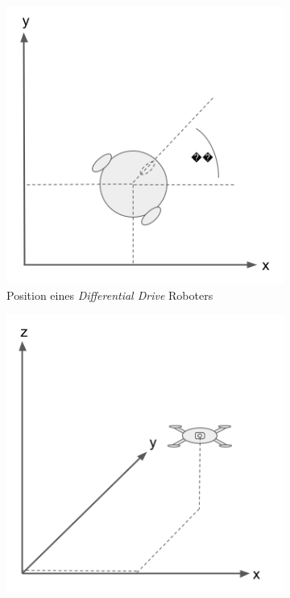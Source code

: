 \mbox{}
\begin{figure}
  \begin{subfigure}[t]{.3\textwidth}
    \centering
    \includegraphics[width=.9\linewidth]{pic/vorwissen/1a_diffdrive.png}
    \caption{Position eines \textit{Differential Drive} Roboters}
    \label{fig:1a_dd}
  \end{subfigure}\hfill
  \begin{subfigure}[t]{.3\textwidth}
    \centering
    \includegraphics[width=.9\linewidth]{pic/vorwissen/1b_uav.png}

\end{subfigure}
\end{figure}

